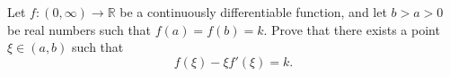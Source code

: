 Let \(f\colon  (0, \infty) \to \mathbb{R}\) be a continuously differentiable function, and let \(b > a > 0\) be real numbers such that \(f(a) = f(b) = k\). Prove that there exists a point \(\xi \in (a, b)\) such that
\[
f(\xi) - \xi f'(\xi) = k.
\]
